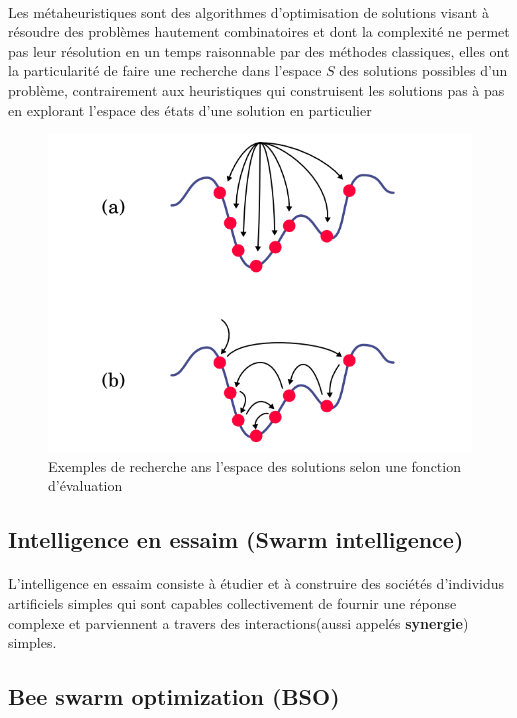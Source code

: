 			\paragraph{}
			Les métaheuristiques sont des algorithmes d'optimisation de solutions visant à résoudre des problèmes hautement combinatoires et dont la complexité ne permet pas leur résolution en un temps raisonnable par des méthodes classiques, elles ont la particularité de faire une recherche dans l'espace $S$ des solutions possibles d'un problème, contrairement aux heuristiques qui construisent les solutions pas à pas en explorant l'espace des états d'une solution en particulier
			\begin{figure}[H]
				\centering
				\includegraphics[scale=0.25]{images/metHeur.png}
				\caption{Exemples de recherche ans l'espace des solutions selon une fonction d'évaluation}
			\end{figure}
		\noindent
		\subsection{Intelligence en essaim (Swarm intelligence) }
		\paragraph{}
		L'intelligence en essaim consiste à étudier et à construire des sociétés d'individus artificiels simples qui sont capables collectivement de fournir une réponse complexe et parviennent a travers des interactions(aussi appelés \textbf{synergie}) simples.
		\subsection{Bee swarm optimization (BSO)}
		
